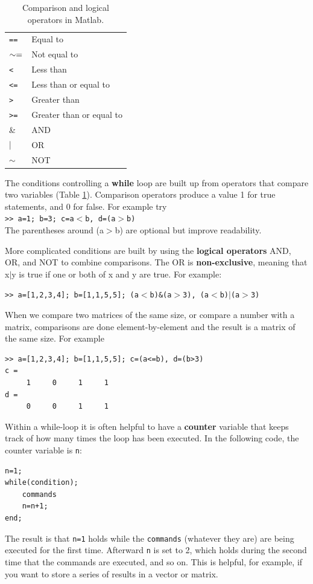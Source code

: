 \documentclass [11pt]{article}
\newcommand{\ttt}[1]{\texttt{#1}}
\newcommand{\tab}{\hspace*{0.5in}}
\numberwithin{exercise}{section}
\begin{document}
\begin{table}
\begin{center}
\begin{tabular}{p{80pt}p{120pt}}
\hline \hline 
{\tt == } & Equal to  \\
$ {\tt \sim =}$ & Not equal to  \\
{\tt <} & Less than  \\
{\tt <=} & Less than or equal to \\
{\tt >} & Greater than \\
{\tt >=} & Greater than or equal to \\
\& & AND  \\
${\tt \vert}$ & OR \\
${\tt \sim}$ & NOT \\
\hline \hline 
\end{tabular}
\caption{Comparison and logical operators in Matlab.}
\label{LogicalOperators}
\end{center}
\end{table}

The conditions controlling a \textbf{while} loop are built up from operators 
that compare two variables (Table \ref{LogicalOperators}). Comparison operators
produce a value 1 for true statements, and 0 for false. For 
example try\\
\tab \ttt{>> a=1; b=3; c=a$<$b, d=(a$>$b)} \\
The parentheses around (a$>$b) are optional but improve readability. 

More complicated conditions are built by using the \textbf{logical operators} AND,
OR, and NOT to combine comparisons.
The OR is \textbf{non-exclusive}, meaning that x$\vert $y is true if one or 
both of x and y are true. For example:

\tab \ttt{>> a=[1,2,3,4]; b=[1,1,5,5]; (a$<$b){\&}(a$>$3), (a$<$b)$\vert $(a$>$3)}

When we compare two matrices of the same size, or compare a 
number with a matrix, comparisons are done element-by-element and the result 
is a matrix of the same size. For example
\begin{verbatim}
>> a=[1,2,3,4]; b=[1,1,5,5]; c=(a<=b), d=(b>3)
c =
     1     0     1     1
d =
     0     0     1     1
\end{verbatim}

Within a while-loop it is often helpful to have a \textbf{counter} variable
that keeps track of how many times the loop has been executed. 
In the following code, the counter variable is \texttt{n}: 
\begin{verbatim}
n=1; 
while(condition);
    commands
    n=n+1; 	
end;
\end{verbatim}
The result is that \texttt{n=1} holds while the \texttt{commands} (whatever they are)
are being executed for the first time. Afterward \texttt{n} is set to 2, which holds
during the second time that the commands are executed, and so on. This is helpful,
for example, if you want to store a series of results in a vector or matrix. 
\end{document}

